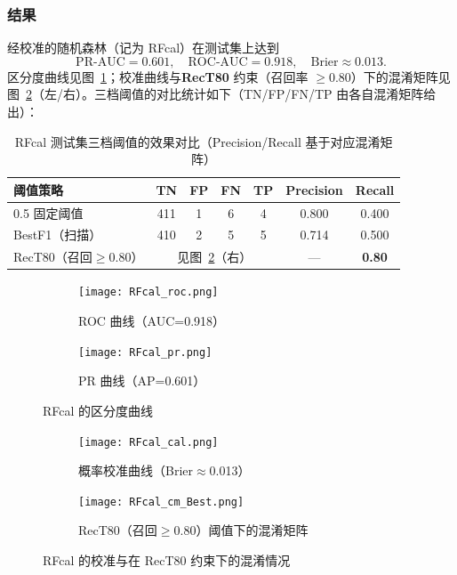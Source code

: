 \documentclass[12pt,a4paper]{ctexart}
\numberwithin{equation}{section}
\theoremstyle{mcm}
\begin{document}
\subsubsection{结果}
经校准的随机森林（记为 RFcal）在测试集上达到
\[
\mathrm{PR\text{-}AUC}=0.601,\quad \mathrm{ROC\text{-}AUC}=0.918,\quad \mathrm{Brier}\approx 0.013.
\]
区分度曲线见图~\ref{fig:q4_rocpr_pair}；校准曲线与\textbf{RecT80} 约束（召回率 $\ge 0.80$）下的混淆矩阵见图~\ref{fig:q4_calcm_pair}（左/右）。三档阈值的对比统计如下（TN/FP/FN/TP 由各自混淆矩阵给出）：
\begin{table}[H]\centering\small
\caption{RFcal 测试集三档阈值的效果对比（Precision/Recall 基于对应混淆矩阵）}
\label{tab:q4_thr}
\begin{tabular}{lcccccc}
\toprule
阈值策略 & TN & FP & FN & TP & Precision & Recall \\
\midrule
0.5 固定阈值  & 411 & 1 & 6 & 4 & 0.800 & 0.400 \\
BestF1（扫描） & 410 & 2 & 5 & 5 & 0.714 & 0.500 \\
RecT80（召回$\ge 0.80$） & \multicolumn{4}{c}{见图~\ref{fig:q4_calcm_pair}（右）} & --- & \textbf{0.80} \\
\bottomrule
\end{tabular}
\end{table}

\begin{figure}[H]\centering
  \begin{subfigure}{0.48\linewidth}
    \texttt{[image: RFcal\_roc.png]}
    \caption{ROC 曲线（AUC=0.918）}
  \end{subfigure}\hfill
  \begin{subfigure}{0.48\linewidth}
    \texttt{[image: RFcal\_pr.png]}
    \caption{PR 曲线（AP=0.601）}
  \end{subfigure}
  \caption{RFcal 的区分度曲线}
  \label{fig:q4_rocpr_pair}
\end{figure}

\begin{figure}[H]\centering
  \begin{subfigure}{0.48\linewidth}
    \texttt{[image: RFcal\_cal.png]}
    \caption{概率校准曲线（Brier$\approx$0.013）}
  \end{subfigure}\hfill
  \begin{subfigure}{0.48\linewidth}
    \texttt{[image: RFcal\_cm\_Best.png]}
    \caption{RecT80（召回$\ge 0.80$）阈值下的混淆矩阵}
  \end{subfigure}
  \caption{RFcal 的校准与在 RecT80 约束下的混淆情况}
  \label{fig:q4_calcm_pair}
\end{figure}
\end{document}
